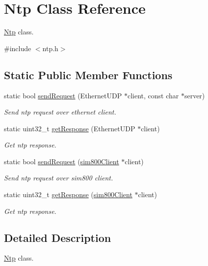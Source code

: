 \hypertarget{classNtp}{}\section{Ntp Class Reference}
\label{classNtp}


\hyperlink{classNtp}{Ntp} class.  




{\ttfamily \#include $<$ntp.\+h$>$}

\subsection*{Static Public Member Functions}
\begin{DoxyCompactItemize}
\item 
static bool \hyperlink{classNtp_a439e0498ea9209f74d91d7cf4d8805b0}{send\+Request} (Ethernet\+U\+DP $\ast$client, const char $\ast$server)
\begin{DoxyCompactList}\small\item\em Send ntp request over ethernet client. \end{DoxyCompactList}\item 
static uint32\+\_\+t \hyperlink{classNtp_a6df9e799d7fb829ff163ea14a70f6999}{get\+Response} (Ethernet\+U\+DP $\ast$client)
\begin{DoxyCompactList}\small\item\em Get ntp response. \end{DoxyCompactList}\item 
static bool \hyperlink{classNtp_a98c5dfc44e09069f5ec607adba8177b2}{send\+Request} (\hyperlink{classsim800Client}{sim800\+Client} $\ast$client)
\begin{DoxyCompactList}\small\item\em Send ntp request over sim800 client. \end{DoxyCompactList}\item 
static uint32\+\_\+t \hyperlink{classNtp_a6456f082f6b3012f72c5064e45791ddd}{get\+Response} (\hyperlink{classsim800Client}{sim800\+Client} $\ast$client)
\begin{DoxyCompactList}\small\item\em Get ntp response. \end{DoxyCompactList}\end{DoxyCompactItemize}


\subsection{Detailed Description}
\hyperlink{classNtp}{Ntp} class. 


